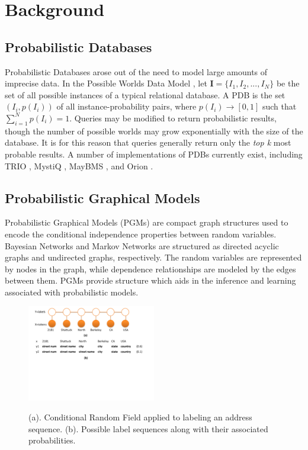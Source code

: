\section{Background}
\subsection{Probabilistic Databases}
Probabilistic Databases arose out of the need to model large amounts of imprecise data.  In the Possible Worlds Data Model \cite{Dalvi07}, let $\mathbf{I}=\{I_{1},I_{2},...,I_{N}\}$ be the set of all possible instances of a typical relational database.  A PDB is the set $(I_{i},p(I_{i}))$ of all instance-probability pairs, where $p(I_{i})\rightarrow[0,1]$ such that $\sum_{i=1}^{N}p(I_{i})=1$.  Queries may be modified to return probabilistic results, though the number of possible worlds may grow exponentially with the size of the database.  It is for this reason that queries generally return only the \textit{top k} most probable results.  A number of implementations of PDBs currently exist, including TRIO \cite{DBLP:conf/vldb/AgrawalBSHNSW06}, MystiQ \cite{Boulos:2005:MSF:1066157.1066277}, MayBMS \cite{Huang09maybms:a}, and Orion \cite{DBLP:conf/comad/SinghMMPHS08}.

\subsection{Probabilistic Graphical Models}
Probabilistic Graphical Models (PGMs) \cite{Koller+Friedman:09, Jordan98} are compact graph structures used to encode the conditional independence properties between random variables.  Bayesian Networks and Markov Networks are structured as directed acyclic graphs and undirected graphs, respectively.  The random variables are represented by nodes in the graph, while dependence relationships are modeled by the edges between them.  PGMs provide structure which aids in the inference and learning associated with probabilistic models.

\begin{figure}
\centering
\includegraphics[width=0.5\textwidth]{images/CRF1.pdf}
\label{fig:CRF}
\caption[example]{\label{fig:CRFexample}(a). Conditional Random Field applied to labeling an address sequence. (b). Possible label sequences along with their associated probabilities.}
\end{figure}

